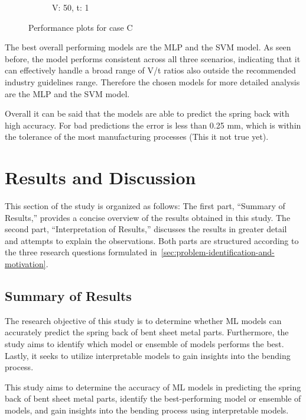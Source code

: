 \begin{figure}[h]
\begin{tcolorbox}[arc=0pt,boxrule=0.5pt]
\begin{subfigure}{0.5\textwidth}
            \caption{V: 50, t: 1}
            \label{fig:performance-50_1}
        \end{subfigure}
    \end{tcolorbox}
    \caption{Performance plots for case C}
    \label{fig:performance-case-c}
\end{figure}

The best overall performing models are the \ac{MLP} and the \ac{SVM} model.
As seen before, the model performs consistent across all three scenarios, indicating that it can
effectively handle a broad range of V/t ratios also outside the recommended industry guidelines
range.
Therefore the chosen models for more detailed analysis are the \ac{MLP} and the \ac{SVM} model.

Overall it can be said that the models are able to predict the spring back with high accuracy.
For bad predictions the error is less than 0.25 mm, which is within the tolerance of the
most manufacturing processes (This it not true yet).


\section{Results and Discussion}\label{sec:results-and-interpretation}
This section of the study is organized as follows:
The first part, ``Summary of Results,'' provides a concise overview of the results obtained in this study. The second
part, ``Interpretation of Results,'' discusses the results in greater detail and attempts to explain the
observations.
Both parts are structured according to the three research questions formulated
in~\ref{sec:problem-identification-and-motivation}.

\subsection{Summary of Results}\label{subsec:summary-of-results}
The research objective of this study is to determine whether \ac{ML} models can accurately predict the spring back of
bent sheet metal parts.
Furthermore, the study aims to identify which model or ensemble of models performs the best.
Lastly, it seeks to utilize interpretable models to gain insights into the bending process.


This study aims to determine the accuracy of \ac{ML} models in predicting the spring back of bent sheet metal parts,
identify the best-performing model or ensemble of models, and gain insights into the bending process using
interpretable models.

